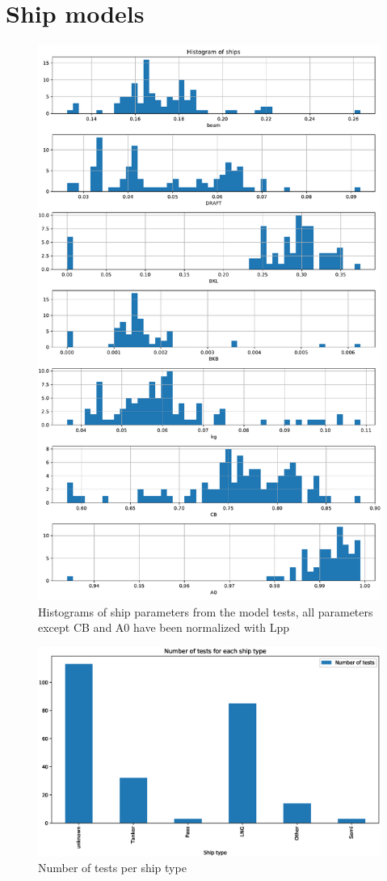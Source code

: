 \section{Ship models}\label{app:ships}
\begin{figure}[H]
    \centering
    \includegraphics[width=0.7\columnwidth]{figures/ship_parameters.pdf}
    \caption{Histograms of ship parameters from the model tests, all parameters except CB and A0 have been normalized with Lpp}
    \label{fig:ship_parameters}
\end{figure}

\begin{figure}[H]
    \centering
    \includegraphics[width=0.7\columnwidth]{figures/ship_types.eps}
    \caption{Number of tests per ship type}
    \label{fig:ship_types}
\end{figure}

